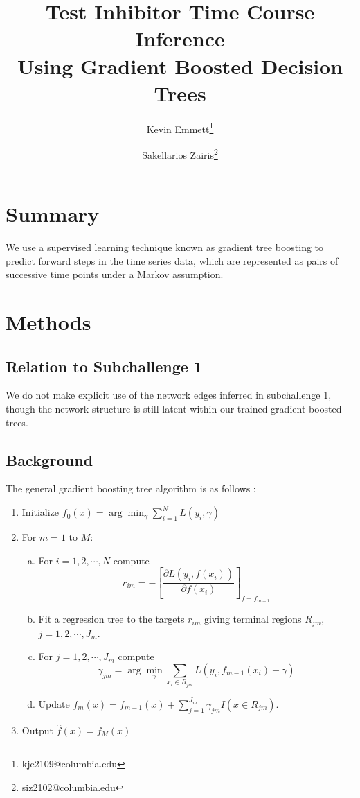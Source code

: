 \documentclass[letterpaper, 11pt]{article}
\title{Test Inhibitor Time Course Inference\\Using Gradient Boosted Decision Trees}
\author[1]{Kevin Emmett\thanks{kje2109@columbia.edu}}
\author[2]{Sakellarios Zairis\thanks{siz2102@columbia.edu}}
\affil[1]{Department of Physics, Columbia University}
\affil[2]{Department of Computational Biology \& Bioinformatics, Columbia University}
\begin{document}
\maketitle

\section{Summary}

We use a supervised learning technique known as gradient tree boosting to predict forward steps in the time series data, which are represented as pairs of successive time points under a Markov assumption.

\section{Methods}

\subsection{Relation to Subchallenge 1}

We do not make explicit use of the network edges inferred in subchallenge 1, though the network structure is still latent within our trained gradient boosted trees.

\subsection{Background}

The general gradient boosting tree algorithm is as follows \citep{Hastie2004}:

\begin{enumerate}
\item Initialize $f_{0}(x) = \arg\min_{\gamma}\sum_{i=1}^N L(y_{i}, \gamma)$
\item For $m=1$ to $M$:
  \begin{enumerate}[(a)]
    \item For $i=1,2,\cdots,N$ compute
      \begin{equation}
        r_{im} = -\left[\frac{\partial L(y_{i},f(x_{i}))}{\partial f(x_{i})}\right]_{f=f_{m-1}}
      \end{equation}
    \item Fit a regression tree to the targets $r_{im}$ giving terminal regions $R_{jm}$, $j=1,2,\cdots,J_m$.
    \item For $j=1,2,\cdots,J_{m}$ compute
      \begin{equation}
        \gamma_{jm} = \arg\min_{\gamma}\displaystyle\sum_{x_{i}\in R_{jm}} L(y_{i}, f_{m-1}(x_{i})+\gamma)
      \end{equation}
    \item Update $f_{m}(x) = f_{m-1}(x) + \sum_{j=1}^{J_m} \gamma_{jm} I(x\in R_{jm})$.
  \end{enumerate}
\item Output $\hat{f}(x) = f_{M}(x)$
\end{enumerate}
\end{document}
